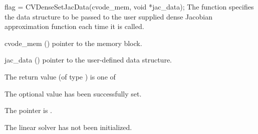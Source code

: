 {
  flag = CVDenseSetJacData(cvode\_mem, void *jac\_data);
}
{
  The function  specifies the data structure
  to be passed to the user supplied dense Jacobian approximation 
  function each time it is called.
}
{
  \begin{args}
  \item[cvode\_mem] ()
    pointer to the {\cvode} memory block.
  \item[jac\_data] ()
    pointer to the user-defined data structure.
  \end{args}
}
{
  The return value  (of type ) is one of
  \begin{args}
  \item[\Id{CVDENSE\_SUCCESS}] 
    The optional value has been successfully set.
  \item[\Id{CVDENSE\_MEM\_NULL}]
    The  pointer is .
  \item[\Id{CVDENSE\_LMEM\_NULL}]
    The {\cvdense} linear solver has not been initialized.
  \end{args}
}
{}
